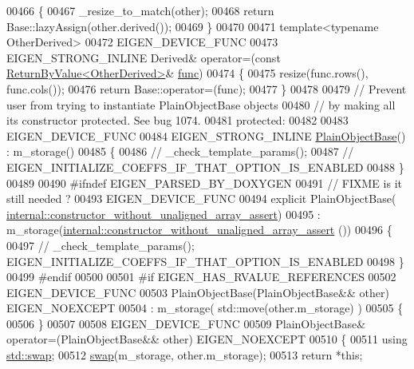 \begin{DoxyCode}
00466     \{
00467       \_resize\_to\_match(other);
00468       \textcolor{keywordflow}{return} Base::lazyAssign(other.derived());
00469     \}
00470 
00471     \textcolor{keyword}{template}<\textcolor{keyword}{typename} OtherDerived>
00472     EIGEN\_DEVICE\_FUNC
00473     EIGEN\_STRONG\_INLINE Derived& operator=(\textcolor{keyword}{const} \hyperlink{group___core___module_class_eigen_1_1_return_by_value}{ReturnByValue<OtherDerived>}& 
      \hyperlink{structfunc}{func})
00474     \{
00475       resize(func.rows(), func.cols());
00476       \textcolor{keywordflow}{return} Base::operator=(func);
00477     \}
00478 
00479     \textcolor{comment}{// Prevent user from trying to instantiate PlainObjectBase objects}
00480     \textcolor{comment}{// by making all its constructor protected. See bug 1074.}
00481   \textcolor{keyword}{protected}:
00482 
00483     EIGEN\_DEVICE\_FUNC
00484     EIGEN\_STRONG\_INLINE \hyperlink{class_eigen_1_1_plain_object_base}{PlainObjectBase}() : m\_storage()
00485     \{
00486 \textcolor{comment}{//       \_check\_template\_params();}
00487 \textcolor{comment}{//       EIGEN\_INITIALIZE\_COEFFS\_IF\_THAT\_OPTION\_IS\_ENABLED}
00488     \}
00489 
00490 \textcolor{preprocessor}{#ifndef EIGEN\_PARSED\_BY\_DOXYGEN}
00491     \textcolor{comment}{// FIXME is it still needed ?}
00493 \textcolor{comment}{}    EIGEN\_DEVICE\_FUNC
00494     \textcolor{keyword}{explicit} PlainObjectBase(
      \hyperlink{struct_eigen_1_1internal_1_1constructor__without__unaligned__array__assert}{internal::constructor\_without\_unaligned\_array\_assert})
00495       : m\_storage(\hyperlink{struct_eigen_1_1internal_1_1constructor__without__unaligned__array__assert}{internal::constructor\_without\_unaligned\_array\_assert}
      ())
00496     \{
00497 \textcolor{comment}{//       \_check\_template\_params(); EIGEN\_INITIALIZE\_COEFFS\_IF\_THAT\_OPTION\_IS\_ENABLED}
00498     \}
00499 \textcolor{preprocessor}{#endif}
00500 
00501 \textcolor{preprocessor}{#if EIGEN\_HAS\_RVALUE\_REFERENCES}
00502     EIGEN\_DEVICE\_FUNC
00503     PlainObjectBase(PlainObjectBase&& other) EIGEN\_NOEXCEPT
00504       : m\_storage( std::move(other.m\_storage) )
00505     \{
00506     \}
00507 
00508     EIGEN\_DEVICE\_FUNC
00509     PlainObjectBase& operator=(PlainObjectBase&& other) EIGEN\_NOEXCEPT
00510     \{
00511       \textcolor{keyword}{using} \hyperlink{endian_8c_a3ca5ecd34b04d6a243c054ac3a57f68d}{std::swap};
00512       \hyperlink{endian_8c_a3ca5ecd34b04d6a243c054ac3a57f68d}{swap}(m\_storage, other.m\_storage);
00513       \textcolor{keywordflow}{return} *\textcolor{keyword}{this};

\end{DoxyCode}
